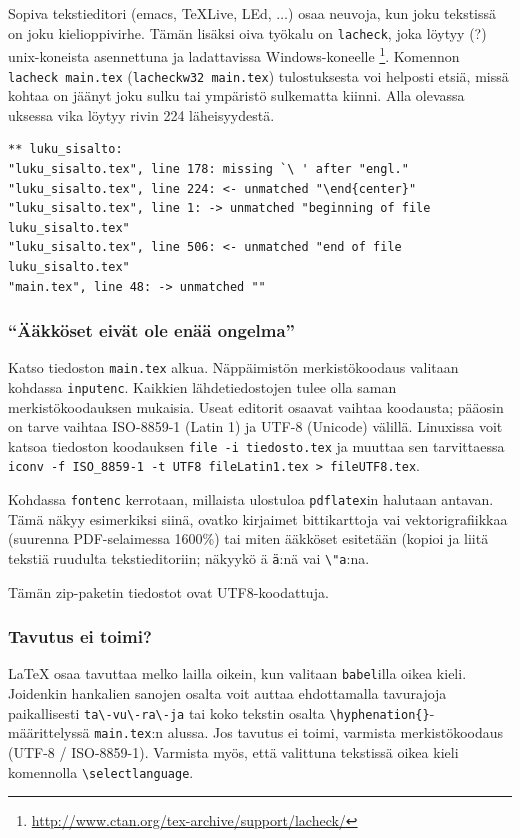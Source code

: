 Sopiva tekstieditori (emacs, TeXLive, LEd, $\ldots$) osaa
neuvoja, kun joku tekstissä on joku kielioppivirhe. Tämän 
lisäksi oiva työkalu on \verb!lacheck!, joka löytyy (?)
unix-koneista asennettuna ja ladattavissa 
Windows-koneelle%
\footnote{\url{http://www.ctan.org/tex-archive/support/lacheck/}}.
Komennon \verb!lacheck main.tex! (\verb!lacheckw32 main.tex!)
tulostuksesta voi helposti etsiä, missä kohtaa on jäänyt joku
sulku tai ympäristö sulkematta kiinni. Alla olevassa 
uksessa
vika löytyy rivin 224 läheisyydestä.
%
\small
\begin{verbatim}
** luku_sisalto:
"luku_sisalto.tex", line 178: missing `\ ' after "engl."
"luku_sisalto.tex", line 224: <- unmatched "\end{center}"
"luku_sisalto.tex", line 1: -> unmatched "beginning of file luku_sisalto.tex"
"luku_sisalto.tex", line 506: <- unmatched "end of file luku_sisalto.tex"
"main.tex", line 48: -> unmatched ""
\end{verbatim}
\normalsize

\subsubsection{``Ääkköset eivät ole enää ongelma''}

Katso tiedoston \verb!main.tex! alkua. Näppäimistön merkistökoodaus
valitaan kohdassa \verb!inputenc!. Kaikkien lähdetiedostojen tulee
olla saman merkistökoodauksen mukaisia.  Useat editorit osaavat
vaihtaa koodausta; pääosin on tarve vaihtaa ISO-8859-1 (Latin 1) ja
UTF-8 (Unicode) välillä. Linuxissa voit katsoa tiedoston koodauksen
\verb!file -i tiedosto.tex! ja muuttaa sen tarvittaessa\\
\verb!iconv -f ISO_8859-1 -t UTF8 fileLatin1.tex > fileUTF8.tex!.

Kohdassa \verb!fontenc! kerrotaan, millaista ulostuloa \verb!pdflatex!in
halutaan antavan. Tämä näkyy esimerkiksi siinä, ovatko kirjaimet
bittikarttoja vai vektorigrafiikkaa (suurenna PDF-selaimessa 1600\%)
tai miten ääkköset esitetään (kopioi ja liitä tekstiä ruudulta 
tekstieditoriin; näkyykö ä \verb!ä!:nä vai \verb!\"a!:na.

Tämän zip-paketin tiedostot ovat UTF8-koodattuja.

\subsubsection{Tavutus ei toimi?}
\label{sec:esim_tavutus}

\LaTeX{} osaa tavuttaa melko lailla oikein, kun valitaan \verb!babel!illa
oikea kieli. Joidenkin hankalien sanojen osalta voit auttaa
ehdottamalla tavurajoja paikallisesti \verb!ta\-vu\-ra\-ja!
tai koko tekstin osalta \verb!\hyphenation{}!-määrittelyssä
\verb!main.tex!:n alussa. Jos tavutus ei toimi, varmista merkistökoodaus
(UTF-8 / ISO-8859-1). Varmista myös, että valittuna tekstissä oikea kieli
komennolla \verb!\selectlanguage!.

